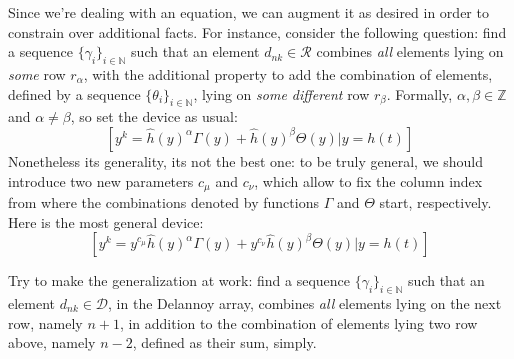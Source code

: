 Since we're dealing with an equation, we can augment it as desired in order to
constrain over additional facts. For instance, consider the following question:
find a sequence $\lbrace \gamma_{i} \rbrace_{i\in\mathbb{N}}$ such that 
an element $d_{nk}\in\mathcal{R}$ combines \emph{all} elements lying on 
\emph{some} row $r_\alpha$, with the additional property to add the combination of 
elements, defined by a sequence $\lbrace \theta_{i} \rbrace_{i\in\mathbb{N}}$, 
lying on \emph{some different} row $r_\beta$. Formally, $\alpha,\beta\in\mathbb{Z}$ 
and $\alpha \not=\beta$, so set the device as usual:
\begin{displaymath}
    \left[y^{k} = \hat{h}(y)^{\alpha} \Gamma(y) + \hat{h}(y)^{\beta} \Theta(y) \big| y = h(t) \right]
\end{displaymath}
Nonetheless its generality, its not the best one: to be truly general,
we should introduce two new parameters $c_\mu$ and $c_\nu$, which allow
to fix the column index from where the combinations denoted by functions
$\Gamma$ and $\Theta$ start, respectively. Here is the most general device:
\begin{displaymath}
    \left[y^{k} = y^{c_\mu}\hat{h}(y)^{\alpha} \Gamma(y) + 
        y^{c_\nu}\hat{h}(y)^{\beta} \Theta(y) \big| y = h(t) \right]
\end{displaymath}

Try to make the generalization at work:
find a sequence $\lbrace \gamma_{i} \rbrace_{i\in\mathbb{N}}$ such that 
an element $d_{nk}\in\mathcal{D}$, in the Delannoy array, 
combines \emph{all} elements lying on 
the next row, namely $n+1$, in addition to the
combination of elements lying two row above, namely $n-2$, 
defined as their sum, simply. 

